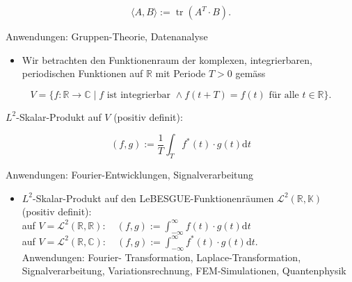 \documentclass[10pt]{article}
\begin{document}
\begin{equation*}
\langle A, B\rangle:=\operatorname{tr}\left(A^{T} \cdot B\right) . \tag{7.60}
\end{equation*}


Anwendungen: Gruppen-Theorie, Datenanalyse

\begin{itemize}
  \item Wir betrachten den Funktionenraum der komplexen, integrierbaren, periodischen Funktionen auf $\mathbb{R}$ mit Periode $T>0$ gemäss
\end{itemize}


\begin{equation*}
V=\{f: \mathbb{R} \rightarrow \mathbb{C} \mid f \text { ist integrierbar } \wedge f(t+T)=f(t) \text { für alle } t \in \mathbb{R}\} . \tag{7.61}
\end{equation*}


$L^{2}$-Skalar-Produkt auf $V$ (positiv definit):


\begin{equation*}
(f, g):=\frac{1}{T} \int_{T} f^{*}(t) \cdot g(t) \mathrm{d} t \tag{7.62}
\end{equation*}


Anwendungen: Fourier-Entwicklungen, Signalverarbeitung

\begin{itemize}
  \item $L^{2}$-Skalar-Produkt auf den LeBESGUE-Funktionenräumen $\mathcal{L}^{2}(\mathbb{R}, \mathbb{K})$ (positiv definit):\\
auf $V=\mathcal{L}^{2}(\mathbb{R}, \mathbb{R}): \quad(f, g):=\int_{-\infty}^{\infty} f(t) \cdot g(t) \mathrm{d} t$\\
auf $V=\mathcal{L}^{2}(\mathbb{R}, \mathbb{C}): \quad(f, g):=\int_{-\infty}^{\infty} f^{*}(t) \cdot g(t) \mathrm{d} t$.\\
Anwendungen: Fourier- Transformation, Laplace-Transformation, Signalverarbeitung, Variationsrechnung, FEM-Simulationen, Quantenphysik
\end{itemize}
\end{document}
